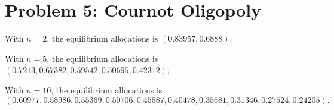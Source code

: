 \section*{Problem 5: Cournot Oligopoly}
With $n=2$, the equilibrium allocations is $(0.83957 , 0.6888)$;

With $n=5$, the equilibrium allocations is $(0.7213 ,    0.67382,     0.59542 ,    0.50695 ,0.42312)$;

With $n=10$, the equilibrium allocations is $$(0.60977  ,   0.58986,     0.55369,     0.50706,     0.45587,     0.40478,     0.35681,     0.31346,     0.27524,     0.24205).$$


